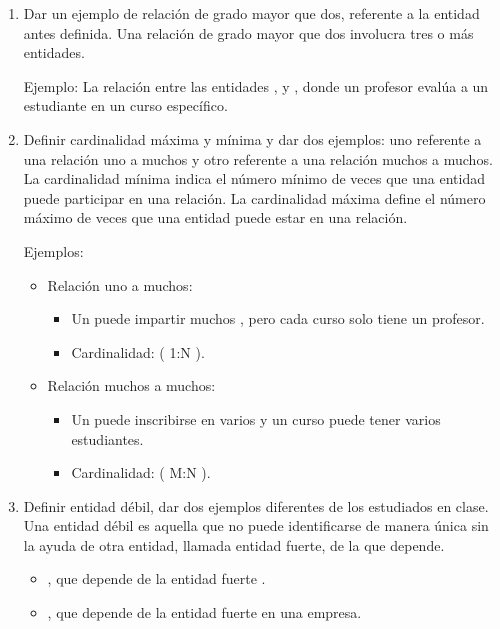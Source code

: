 \begin{enumerate}[label=\textbf{\arabic*.}, itemsep=0.5em]
        \item Dar un ejemplo de relación de grado mayor que dos, referente a la entidad antes definida.  
        Una relación de grado mayor que dos involucra tres o más entidades.  
        
        Ejemplo: La relación  entre las entidades ,  y , donde un profesor evalúa a un estudiante en un curso específico.
        
        \item Definir cardinalidad máxima y mínima y dar dos ejemplos: uno referente a una relación uno a muchos y otro referente a una relación muchos a muchos.  
        La cardinalidad mínima indica el número mínimo de veces que una entidad puede participar en una relación. La cardinalidad máxima define el número máximo de veces que una entidad puede estar en una relación.
        
        Ejemplos:  
        \begin{itemize}
            \item Relación uno a muchos:
            \begin{itemize}
                \item Un  puede impartir muchos , pero cada curso solo tiene un profesor.
                \item Cardinalidad: ( 1:N ).
            \end{itemize}
            \item Relación muchos a muchos:
            \begin{itemize}
                \item Un  puede inscribirse en varios  y un curso puede tener varios estudiantes.
                \item Cardinalidad: ( M:N ).
            \end{itemize}
        \end{itemize}
        \item Definir entidad débil, dar dos ejemplos diferentes de los estudiados en clase.  
        Una entidad débil es aquella que no puede identificarse de manera única sin la ayuda de otra entidad, llamada entidad fuerte, de la que depende.  
        
        \begin{itemize}
            \item {}, que depende de la entidad fuerte .
            \item {}, que depende de la entidad fuerte  en una empresa.
        \end{itemize}
        

\end{enumerate}
